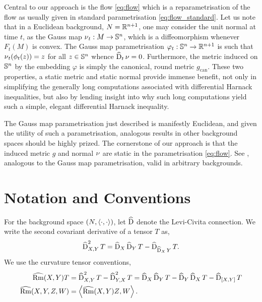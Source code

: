 \documentclass{amsart}
\begin{document}
Central to our approach is the flow \eqref{eq:flow} which is a reparametrisation of the flow as usually given in standard parametrisation \eqref{eq:flow_standard}. Let us note that in a Euclidean background, $N = \mathbb{R}^{n+1}$, one may consider the unit normal at time $t$, as the Gauss map $\operatorname{\nu}_t : M \to \mathbb{S}^n$, which is a diffeomorphism whenever $F_t(M)$ is convex. The Gauss map parametrisation $\varphi_t: \mathbb{S}^n \to \mathbb{R}^{n+1}$ \cite{MR1296393} is such that $\operatorname{\nu}_t(\phi_t(z)) = z$ for all $z \in \mathbb{S}^n$ whence $\operatorname{\widehat{D}}_t \operatorname{\nu} = 0$. Furthermore, the metric induced on $\mathbb{S}^n$ by the embedding $\varphi$ is simply the canonical, round metric $g_{\operatorname{can}}$. These two properties, a static metric and static normal provide immense benefit, not only in simplifying the generally long computations associated with differential Harnack inequalities, but also by lending insight into why such long computations yield such a simple, elegant differential Harnack inequality.

The Gauss map parametrisation just described is manifestly Euclidean, and given the utility of such a parametrisation, analogous results in other background spaces should be highly prized. The cornerstone of our approach is that the induced metric \(g\) and normal \(\operatorname{\nu}\) are static in the parametrisation \eqref{eq:flow}. See , analogous to the Gauss map parametrisation, valid in arbitrary backgrounds.

\section{Notation and Conventions}

For the background space \((N, \bgg)\), let \(\operatorname{\widehat{D}}\) denote the Levi-Civita connection. We write the second covariant derivative of a tensor \(T\) as,
\[
\operatorname{\widehat{D}}^2_{X, Y} T = \operatorname{\widehat{D}}_X \operatorname{\widehat{D}}_Y T - \operatorname{\widehat{D}}_{\operatorname{\widehat{D}}_X Y} T.
\]
We use the curvature tensor conventions,
\begin{align*}
\bgRm(X, Y) T &= \bgD^2_{X, Y} T - \bgD^2_{Y, X} T = \bgD_X \bgD_Y T - \bgD_Y \bgD_X T - \bgD_{[X, Y]} T \\
\bgRm(X, Y, Z, W) &= \bgg[\bgRm(X, Y) Z][W].
\end{align*}
\end{document}
